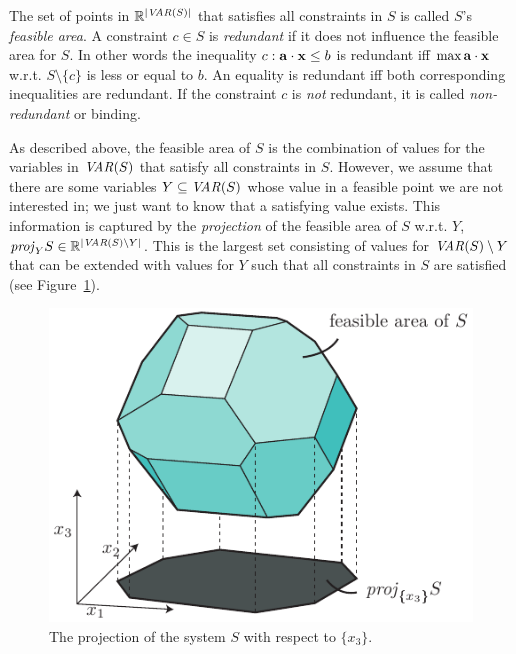 The set of points in $\mathbb{R}^{|\mathit{VAR}(S)|}$ that satisfies all constraints in $S$ is called $S$'s \emph{feasible area}. A constraint $c\in S$ is \emph{redundant} if it does not influence the feasible area for $S$. In other words the inequality $c: \mathbf{a}\cdot\mathbf{x}\leq b$ is redundant iff $\max \mathbf{a}\cdot\mathbf{x}$ w.r.t. $S\setminus\{c\}$ is less or equal to $b$.
An equality is redundant iff both corresponding inequalities are redundant.
If the constraint $c$ is \emph{not} redundant, it is called \emph{non-redundant} or binding.

As described above, the feasible area of $S$ is the combination of values for the variables in $\mathit{VAR}(S)$ that satisfy all constraints in $S$. However, we assume that there are some variables $Y\subseteq \mathit{VAR}(S)$ whose value in a feasible point we are not interested in; we just want to know that a satisfying value exists. This information is captured by the \emph{projection} of the feasible area of $S$ w.r.t. $Y$, $\mathit{proj}_YS\in\mathbb{R}^{|\mathit{VAR}(S)\setminus Y|}$. This is the largest set consisting of values for $\mathit{VAR}(S)\setminus Y$ that can be extended with values for $Y$ such that all constraints in $S$ are satisfied (see Figure~\ref{fig:proj}). 

\begin{figure}
	\centering
		\includegraphics[scale=0.8]{figures/projection2.pdf}
	\caption{The projection of the system $S$ with respect to $\{x_3\}$.}
	\label{fig:proj}
\end{figure}

